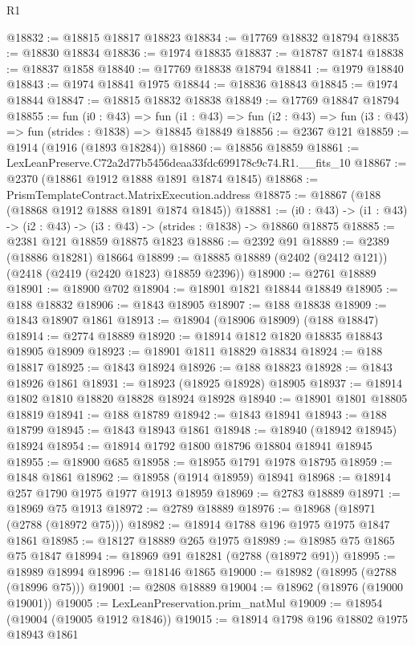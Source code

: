 \begin{lexlean}{R1}
\begin{coremodule}
@18832 := @18815 @18817 @18823
@18834 := @17769 @18832 @18794
@18835 := @18830 @18834
@18836 := @1974 @18835
@18837 := @18787 @1874
@18838 := @18837 @1858
@18840 := @17769 @18838 @18794
@18841 := @1979 @18840
@18843 := @1974 @18841 @1975
@18844 := @18836 @18843
@18845 := @1974 @18844
@18847 := @18815 @18832 @18838
@18849 := @17769 @18847 @18794
@18855 := fun (i0 : @43) =>
  fun (i1 : @43) => fun (i2 : @43) => fun (i3 : @43) => fun (strides : @1838) => @18845 @18849
@18856 := @2367 @121
@18859 := @1914 (@1916 (@1893 @18284))
@18860 := @18856 @18859
@18861 := LexLeanPreserve.C72a2d77b5456deaa33fdc699178c9c74.R1.__fits_10
@18867 := @2370 (@18861 @1912 @1888 @1891 @1874 @1845)
@18868 := PrismTemplateContract.MatrixExecution.address
@18875 := @18867 (@188 (@18868 @1912 @1888 @1891 @1874 @1845))
@18881 := (i0 : @43) -> (i1 : @43) -> (i2 : @43) -> (i3 : @43) -> (strides : @1838) -> @18860 @18875
@18885 := @2381 @121 @18859 @18875 @1823
@18886 := @2392 @91
@18889 := @2389 (@18886 @18281) @18664
@18899 := @18885 @18889 (@2402 (@2412 @121)) (@2418 (@2419 (@2420 @1823) @18859 @2396))
@18900 := @2761 @18889
@18901 := @18900 @702
@18904 := @18901 @1821 @18844 @18849
@18905 := @188 @18832
@18906 := @1843 @18905
@18907 := @188 @18838
@18909 := @1843 @18907 @1861
@18913 := @18904 (@18906 @18909) (@188 @18847)
@18914 := @2774 @18889
@18920 := @18914 @1812 @1820 @18835 @18843 @18905 @18909
@18923 := @18901 @1811 @18829 @18834
@18924 := @188 @18817
@18925 := @1843 @18924
@18926 := @188 @18823
@18928 := @1843 @18926 @1861
@18931 := @18923 (@18925 @18928) @18905
@18937 := @18914 @1802 @1810 @18820 @18828 @18924 @18928
@18940 := @18901 @1801 @18805 @18819
@18941 := @188 @18789
@18942 := @1843 @18941
@18943 := @188 @18799
@18945 := @1843 @18943 @1861
@18948 := @18940 (@18942 @18945) @18924
@18954 := @18914 @1792 @1800 @18796 @18804 @18941 @18945
@18955 := @18900 @685
@18958 := @18955 @1791 @1978 @18795
@18959 := @1848 @1861
@18962 := @18958 (@1914 @18959) @18941
@18968 := @18914 @257 @1790 @1975 @1977 @1913 @18959
@18969 := @2783 @18889
@18971 := @18969 @75 @1913
@18972 := @2789 @18889
@18976 := @18968 (@18971 (@2788 (@18972 @75)))
@18982 := @18914 @1788 @196 @1975 @1975 @1847 @1861
@18985 := @18127 @18889 @265 @1975
@18989 := @18985 @75 @1865 @75 @1847
@18994 := @18969 @91 @18281 (@2788 (@18972 @91))
@18995 := @18989 @18994
@18996 := @18146 @1865
@19000 := @18982 (@18995 (@2788 (@18996 @75)))
@19001 := @2808 @18889
@19004 := @18962 (@18976 (@19000 @19001))
@19005 := LexLeanPreservation.prim_natMul
@19009 := @18954 (@19004 (@19005 @1912 @1846))
@19015 := @18914 @1798 @196 @18802 @1975 @18943 @1861

\end{coremodule}
\end{lexlean}
